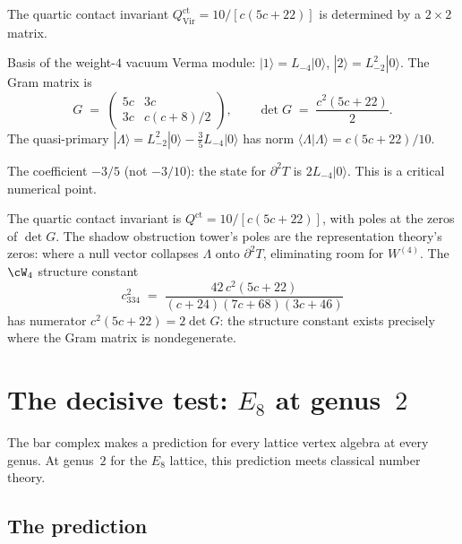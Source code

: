 The quartic contact invariant
$Q^{\mathrm{ct}}_{\mathrm{Vir}} = 10/[c(5c+22)]$ is
determined by a $2 \times 2$ matrix.

Basis of the weight-$4$ vacuum Verma module:
$|1\rangle = L_{-4}|0\rangle$,
$|2\rangle = L_{-2}^2|0\rangle$. The Gram matrix is
\begin{equation}\label{eq:comp-gram-matrix}
G \;=\; \begin{pmatrix} 5c & 3c \\ 3c & c(c+8)/2
\end{pmatrix},
\qquad
\det G \;=\; \frac{c^2(5c+22)}{2}.
\end{equation}
The quasi-primary
$|\Lambda\rangle = L_{-2}^2|0\rangle - \frac{3}{5}L_{-4}|0\rangle$
has norm $\langle\Lambda|\Lambda\rangle = c(5c+22)/10$.

The coefficient $-3/5$ (not $-3/10$): the state for
$\partial^2 T$ is $2L_{-4}|0\rangle$. This is a critical
numerical point.

The quartic contact invariant is
$Q^{\mathrm{ct}} = 10/[c(5c{+}22)]$, with poles at the zeros
of $\det G$. The shadow obstruction tower's poles are the
representation theory's zeros: where a null vector collapses
$\Lambda$ onto $\partial^2 T$, eliminating room for
$W^{(4)}$. The $\cW_4$ structure constant
\begin{equation}\label{eq:comp-c334}
 c_{334}^2 \;=\;
 \frac{42\,c^2(5c+22)}{(c+24)(7c+68)(3c+46)}
\end{equation}
has numerator $c^2(5c+22) = 2\det G$: the structure constant
exists precisely where the Gram matrix is nondegenerate.


\section{The decisive test: $E_8$ at genus~$2$}
\label{sec:comp-e8}

The bar complex makes a prediction for every lattice vertex
algebra at every genus. At genus~$2$ for the $E_8$ lattice,
this prediction meets classical number theory.


\subsection{The prediction}
\label{subsec:comp-e8-prediction}

